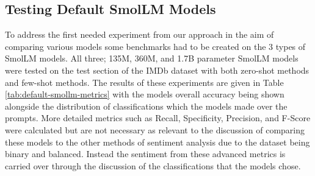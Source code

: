 \documentclass[10pt,twocolumn,letterpaper]{article}
\begin{document}
\subsection{Testing Default SmolLM Models}
To address the first needed experiment from our approach in the aim of comparing various models some benchmarks had to be created on the 3 types of SmolLM models. All three; 135M, 360M, and 1.7B parameter  SmolLM models were tested on the test section of the IMDb dataset \cite{IMDB-dataset} with both zero-shot methods and few-shot methods. The results of these experiments are given in Table \ref{tab:default-smollm-metrics} with the models overall accuracy being shown alongside the distribution of classifications which the models made over the prompts. More detailed metrics such as Recall, Specificity, Precision, and F-Score were calculated but are not necessary as relevant to the discussion of comparing these models to the other methods of sentiment analysis due to the dataset being binary and balanced. Instead the sentiment from these advanced metrics is carried over through the discussion of the classifications that the models chose. 






\end{document}
